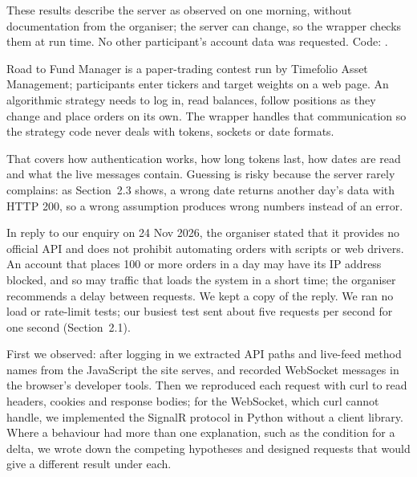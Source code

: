 \documentclass[9pt]{article}
\newcommand{\seclabel}{\par\Needspace{9\baselineskip}\vspace{6pt}}
\newcommand{\code}[1]{{\ttfamily\detokenize{#1}}}
\begin{document}
\vspace{3pt}
{\fontsize{7}{8.6}\selectfont\color{greyD}These results describe the server as observed on one morning, without documentation from the organiser; the server can change, so the wrapper checks them at run time. No other participant's account data was requested. Code: \href{https://github.com/chlanstjr0301/pytimefolio}{\code{github.com/chlanstjr0301/pytimefolio}}.\par}
\clearpage
\seclabel
{}

 Road to Fund Manager is a paper-trading contest run by Timefolio Asset Management; participants enter tickers and target weights on a web page. An algorithmic strategy needs to log in, read balances, follow positions as they change and place orders on its own. The wrapper handles that communication so the strategy code never deals with tokens, sockets or date formats.

 That covers how authentication works, how long tokens last, how dates are read and what the live messages contain. Guessing is risky because the server rarely complains: as Section~2.3 shows, a wrong date returns another day's data with HTTP 200, so a wrong assumption produces wrong numbers instead of an error.

 In reply to our enquiry on 24 Nov 2026, the organiser stated that it provides no official API and does not prohibit automating orders with scripts or web drivers. An account that places 100 or more orders in a day may have its IP address blocked, and so may traffic that loads the system in a short time; the organiser recommends a delay between requests. We kept a copy of the reply. We ran no load or rate-limit tests; our busiest test sent about five requests per second for one second (Section~2.1).

 First we observed: after logging in we extracted API paths and live-feed method names from the JavaScript the site serves, and recorded WebSocket messages in the browser's developer tools. Then we reproduced each request with curl to read headers, cookies and response bodies; for the WebSocket, which curl cannot handle, we implemented the SignalR protocol in Python without a client library. Where a behaviour had more than one explanation, such as the condition for a delta, we wrote down the competing hypotheses and designed requests that would give a different result under each.
\end{document}
